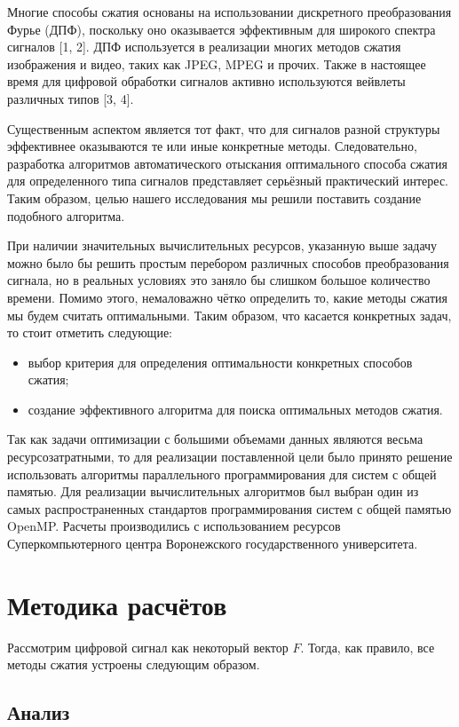 \documentclass[11pt, oneside, a4paper]{article}
\begin{document}
Многие способы сжатия основаны на использовании дискретного преобразования Фурье (ДПФ), поскольку оно оказывается эффективным для широкого спектра сигналов [1, 2]. ДПФ используется в реализации многих методов сжатия изображения и видео, таких как JPEG, MPEG и прочих. Также в настоящее время для цифровой обработки сигналов активно используются вейвлеты различных типов [3, 4].

Существенным аспектом является тот факт, что для сигналов разной структуры эффективнее оказываются те или иные конкретные методы. Следовательно, разработка алгоритмов автоматического отыскания оптимального способа сжатия для определенного типа сигналов представляет серьёзный практический интерес. Таким образом, целью нашего исследования мы решили поставить создание подобного алгоритма.

При наличии значительных вычислительных ресурсов, указанную выше задачу можно было бы решить простым перебором различных способов преобразования сигнала, но в реальных условиях это заняло бы слишком большое количество времени. Помимо этого, немаловажно чётко определить то, какие методы сжатия мы будем считать оптимальными. Таким образом, что касается конкретных задач, то стоит отметить следующие:
\begin{itemize}
\item выбор критерия для определения оптимальности конкретных способов сжатия;
\item создание эффективного алгоритма для поиска оптимальных методов сжатия.
\end{itemize}

Так как задачи оптимизации с большими объемами данных являются весьма  ресурсозатратными, то для реализации поставленной цели было принято решение использовать алгоритмы параллельного программирования для систем с общей памятью. Для реализации вычислительных алгоритмов был выбран один из самых распространенных стандартов программирования систем с общей памятью OpenMP. Расчеты производились с использованием ресурсов Суперкомпьютерного центра Воронежского государственного университета.

\section{Методика расчётов}

Рассмотрим цифровой сигнал как некоторый вектор $F$. Тогда, как правило, все методы сжатия устроены следующим образом.

\subsection{Анализ} 
\end{document}
